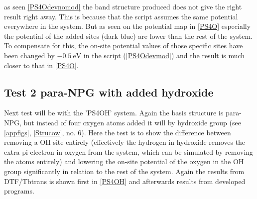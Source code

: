as seen \cref{PS4Odevnomod} the band structure produced does not give the right result right away. This is because that the script assumes the same potential everywhere in the system. But as seen on the potential map in \cref{PS4O} especially the potential of the added sites (dark blue) are lower than the rest of the system. To compensate for this, the on-site potential values of those specific sites have been changed by \(\SI{-0.5}{\electronvolt}\) in the script (\cref{PS4Odevmod}) and the result is much closer to that in \cref{PS4O}.
\subsection{Test 2 para-NPG with added hydroxide}
Next test will be with the 'PS4OH' system. Again the basis structure is para-NPG, but instead of four oxygen atoms added it will by hydroxide group (see \cref{appfigs}, \cref{Strucow}, no. 6). Here the test is to show the difference between removing a OH site entirely (effectively the hydrogen in hydroxide removes the extra pi-electron in oxygen from the system, which can be simulated by removing the atoms entirely) and lowering the on-site potential of the oxygen in the OH group significantly in relation to the rest of the system. Again the results from DTF/Tbtrans is shown first in \cref{PS4OH} and afterwards results from developed programs. 
